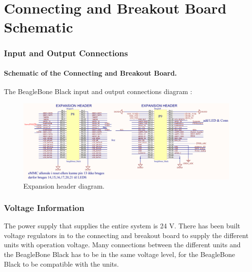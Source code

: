 \chapter{Connecting and Breakout Board Schematic}\label{app:ConnectingBreakoutBoard} 
\subsection{Input and Output Connections}

\subsubsection{Schematic of the Connecting and Breakout Board.}

The BeagleBone Black input and output connections diagram :\\
\begin{figure}[H]
	\centering
	\includegraphics[scale=0.92]{figures/ExpanionHeader.pdf}
	\caption{Expansion header diagram.}
	\label{labExpanionHeader}
\end{figure}\vspace{-5mm}

\subsection{Voltage Information}
The power supply that supplies the entire system is 24 V. There has been built voltage regulators in to the connecting and breakout board to supply the different units with operation voltage. Many connections between the different units and the BeagleBone Black has to be in the same voltage level, for the BeagleBone Black to be compatible with the units.

